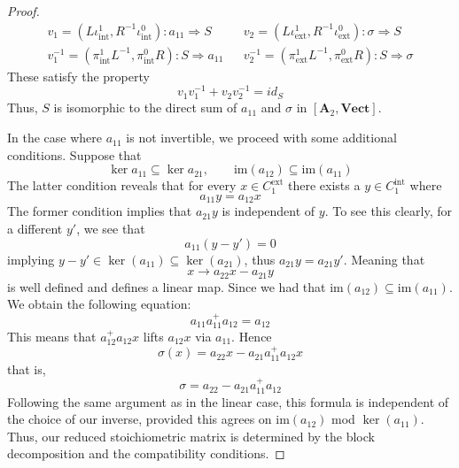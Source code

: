 \documentclass[10pt,a4paper]{amsart}
\begin{document}
\begin{proof}
    \begin{align*}
        v_1=(L\iota_{\textrm{int}}^1, R^{-1}\iota_{\textrm{int}}^0): a_{11}\Rightarrow S &&
        v_2=(L\iota_{\textrm{ext}}^1, R^{-1}\iota_{\textrm{ext}}^0): \sigma \Rightarrow S \\
        v_1^{-1}=(\pi_{\textrm{int}}^1L^{-1}, \pi_{\textrm{int}}^0R): S \Rightarrow a_{11} &&
        v_2^{-1}=(\pi_{\textrm{ext}}^1L^{-1}, \pi_{\textrm{ext}}^0R): S \Rightarrow \sigma
    \end{align*}
    These satisfy the property
    \begin{equation*}
        v_1v_1^{-1} + v_2v_2^{-1} = id_S
    \end{equation*}
    Thus, $S$ is isomorphic to the direct sum of $a_{11}$ and $\sigma$ in $[\mathbf{A}_2, \textbf{Vect}]$.

    \noindent In the case where $a_{11}$ is not invertible, we proceed with some additional conditions. Suppose that 
    \[
    \ker a_{11} \subseteq \ker a_{21}, \qquad \textrm{im}(a_{12})\subseteq \textrm{im}(a_{11})
    \]
    The latter condition reveals that for every $x \in C_{1}^{\textrm{ext}}$ there exists a $y \in C_1^{\textrm{int}}$ where 
    \[
    a_{11}y=a_{12}x
    \]
    The former condition implies that $a_{21}y$ is independent of $y$. To see this clearly, for a different $y'$, we see that 
    \[
    a_{11}(y-y') = 0
    \]
    implying $y - y' \in \ker (a_{11}) \subseteq \ker (a_{21})$, thus $a_{21}y = a_{21}y'$. Meaning that 
    \[
    x \longrightarrow a_{22}x - a_{21}y
    \]
    is well defined and defines a linear map.
    Since we had that $\textrm{im}(a_{12}) \subseteq \textrm{im}(a_{11})$. We obtain the following equation:
    \[
    a_{11}a_{11}^{+}a_{12} = a_{12}
    \]
    This means that $a_{12}^{+}a_{12}x$ lifts $a_{12}x$ via $a_{11}$. Hence
    \[
    \sigma (x) = a_{22}x - a_{21}a_{11}^{+}a_{12}x
    \]
    that is,
    \[
    \sigma = a_{22} - a_{21}a_{11}^{+}a_{12}
    \]
    Following the same argument as in the linear case, this formula is independent of the choice of our inverse, provided this agrees on $\textrm{im}(a_{12})$ mod $\ker (a_{11})$. Thus, our reduced stoichiometric matrix is determined by the block decomposition and the compatibility conditions.
\end{proof}
\end{document}
